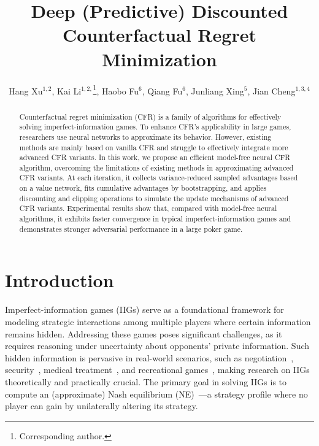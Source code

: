 \documentclass[letterpaper]{article} %
\title{Deep (Predictive) Discounted Counterfactual Regret Minimization}
\author{
    Hang Xu$^{1, 2}$,
    Kai Li$^{1, 2,}$\thanks{Corresponding author.},
    Haobo Fu$^{6}$,
    Qiang Fu$^{6}$,
    Junliang Xing$^{5}$,
    Jian Cheng$^{1,3,4}$\\
}
\begin{document}
\maketitle

\begin{abstract}
    Counterfactual regret minimization (CFR) is a family of algorithms for effectively solving imperfect-information games. 
    To enhance CFR's applicability in large games, researchers use neural networks to approximate its behavior. 
    However, existing methods are mainly based on vanilla CFR and struggle to effectively integrate more advanced CFR variants.
    In this work, we propose an efficient model-free neural CFR algorithm, overcoming the limitations of existing methods in approximating advanced CFR variants. At each iteration, it collects variance-reduced sampled advantages based on a value network, fits cumulative advantages by bootstrapping, and applies discounting and clipping operations to simulate the update mechanisms of advanced CFR variants.
    Experimental results show that, compared with model-free neural algorithms, it exhibits faster convergence in typical imperfect-information games and demonstrates stronger adversarial performance in a large poker game.
\end{abstract}

\begin{links}
\end{links}

\section{Introduction}

Imperfect-information games (IIGs) serve as a foundational framework for modeling strategic interactions among multiple players where certain information remains hidden. 
Addressing these games poses significant challenges, as it requires reasoning under uncertainty about opponents' private information. 
Such hidden information is pervasive in real-world scenarios, such as negotiation~\cite{gratch2016misrepresentation}, security~\cite{lisy2016counterfactual}, medical treatment~\cite{sandholm2015steering}, and recreational games~\cite{brown2019superhuman}, making research on IIGs theoretically and practically crucial.  
The primary goal in solving IIGs is to compute an (approximate) Nash equilibrium (NE)~\cite{nash1950equilibrium}---a strategy profile where no player can gain by unilaterally altering its strategy.
\end{document}

